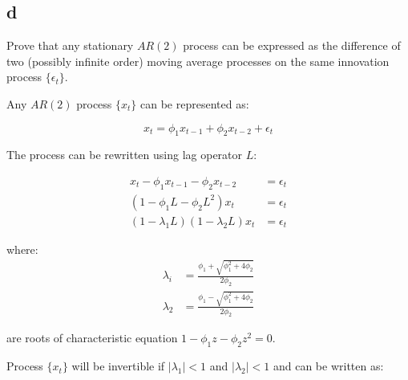 \subsection{d} 
\label{section_2_d}
Prove that any stationary $AR(2)$ process can be expressed as the difference of two (possibly infinite order) 
moving average processes on the same innovation process $\{\epsilon_t\}$.

\begin{solution}

Any $AR(2)$ process $\{x_t\}$ can be represented as:

\begin{equation}
x_t = \phi_1 x_{t-1} + \phi_2 x_{t-2} + \epsilon_t
\end{equation}

The process can be rewritten using lag operator $L$: 

\begin{equation}
\begin{aligned}
x_t - \phi_1 x_{t-1} - \phi_2 x_{t-2}  & = \epsilon_t \\
       (1 - \phi_1 L - \phi_2 L^2)x_t  & = \epsilon_t \\
			(1 - \lambda_1L)(1-\lambda_2L)x_t  & = \epsilon_t
\end{aligned}
\end{equation}

where:
\begin{equation}
\nonumber
\begin{aligned}
\lambda_i & = \frac{\phi_1 + \sqrt{\phi_1^2 + 4\phi_2}}{2\phi_2} \\
\lambda_2 & = \frac{\phi_1 - \sqrt{\phi_1^2 + 4\phi_2}}{2\phi_2} 
\end{aligned}
\end{equation}

are roots of characteristic equation $1 - \phi_1 z - \phi_2 z^2 = 0$.

Process $\{x_t\}$ will be invertible if $|\lambda_1| < 1$ and $|\lambda_2| < 1$ and can be written as:


\end{solution}
